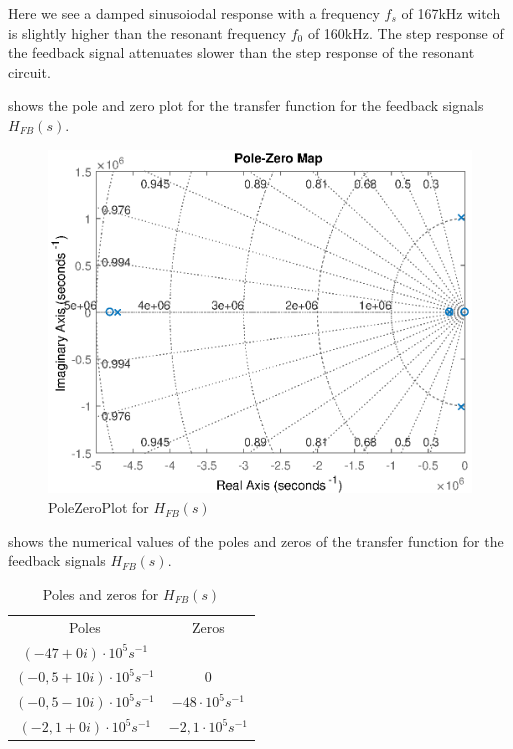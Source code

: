 Here we see a damped sinusoiodal response with a frequency $f_s$ of 167kHz witch is slightly higher than the resonant frequency $f_0$ of 160kHz. The step response of the feedback signal attenuates slower than the step response of the resonant circuit.

 shows the pole and zero plot for the transfer function for the feedback signals $H_{FB}(s)$.

\begin{figure}[H]
    \centering
    \includegraphics[width=\textwidth]{img/FeedBackPoleZeroPlot.eps}
    \caption{PoleZeroPlot for $H_{FB}(s)$}
    \label{fig:fbpolezero}
\end{figure}

 shows the numerical values of the poles and zeros of the transfer function for the feedback signals $H_{FB}(s)$.

\begin{table}[H]
    \centering
    \begin{tabular}{c|c}
        Poles & Zeros \\
        $(-47 + 0i)\cdot 10^{5} s^{-1}$ & \\
        $(-0,5 + 10i)\cdot 10^{5} s^{-1}$ & $0$ \\
        $(-0,5 - 10i)\cdot 10^{5} s^{-1}$ & $-48\cdot 10^{5} s^{-1}$ \\
        $(-2,1 + 0i)\cdot 10^{5} s^{-1}$ & $-2,1\cdot 10^{5} s^{-1}$ \\
    \end{tabular}
    \caption{Poles and zeros for $H_{FB}(s)$}
    \label{tab:fbcoilrigpoles}
\end{table}

